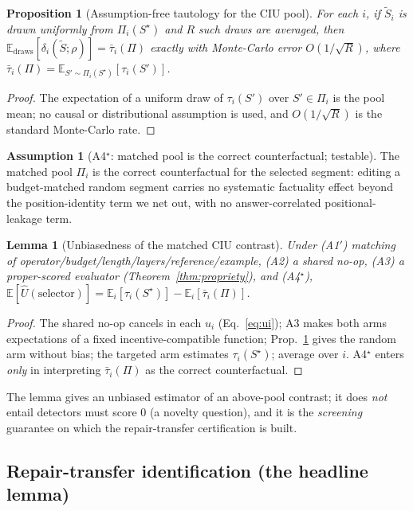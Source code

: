 \documentclass[11pt]{article}
\theoremstyle{plain}
\newtheorem{lemma}{Lemma}
\newtheorem{proposition}{Proposition}
\theoremstyle{definition}
\newtheorem{assumption}{Assumption}
\newcommand{\Uhat}{\widehat{U}}
\newcommand{\Pii}{\Pi_i}
\newcommand{\bartau}{\bar{\tau}}
\newcommand{\Eop}{\mathbb{E}}
\newcommand{\Sstar}{S^{\star}}
\begin{document}
\begin{proposition}[Assumption-free tautology for the CIU pool]\label{prop:tautology}
For each $i$, if $\tilde S_i$ is drawn uniformly from $\Pii(\Sstar)$ and $R$ such
draws are averaged, then $\Eop_{\mathrm{draws}}[\delta_i(\tilde S;\rho)]=\bartau_i(\Pi)$
exactly with Monte-Carlo error $O(1/\sqrt{R})$, where
$\bartau_i(\Pi)=\Eop_{S'\sim\Pii(\Sstar)}[\tau_i(S')]$.
\end{proposition}
\begin{proof}
The expectation of a uniform draw of $\tau_i(S')$ over $S'\in\Pii$ is the pool mean;
no causal or distributional assumption is used, and $O(1/\sqrt{R})$ is the standard
Monte-Carlo rate.
\end{proof}
\begin{assumption}[A4$^\star$: matched pool is the correct counterfactual; testable]\label{ass:a4}
The matched pool $\Pii$ is the correct counterfactual for the selected segment:
editing a budget-matched random segment carries no systematic factuality effect
beyond the position-identity term we net out, with no answer-correlated
positional-leakage term.
\end{assumption}
\begin{lemma}[Unbiasedness of the matched CIU contrast]\label{lem:unbiased}
Under (A1$'$) matching of operator/budget/length/layers/reference/example, (A2) a
shared no-op, (A3) a proper-scored evaluator (Theorem~\ref{thm:propriety}), and
(A4$^\star$),
$\Eop[\Uhat(\text{selector})]=\Eop_i[\tau_i(\Sstar)]-\Eop_i[\bartau_i(\Pi)]$.
\end{lemma}
\begin{proof}
The shared no-op cancels in each $u_i$ (Eq.~\ref{eq:ui}); A3 makes both arms
expectations of a fixed incentive-compatible function; Prop.~\ref{prop:tautology}
gives the random arm without bias; the targeted arm estimates $\tau_i(\Sstar)$;
average over $i$. A4$^\star$ enters \emph{only} in interpreting $\bartau_i(\Pi)$ as
the correct counterfactual.
\end{proof}
\noindent The lemma gives an unbiased estimator of an above-pool contrast; it does
\emph{not} entail detectors must score $0$ (a novelty question), and it is the
\emph{screening} guarantee on which the repair-transfer certification is built.

\subsection{Repair-transfer identification (the headline lemma)}\label{sec:theory:rident}
\end{document}
